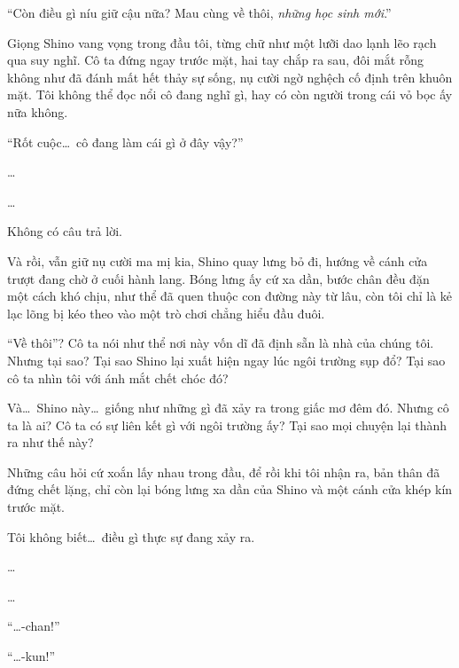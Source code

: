 \documentclass[../main.tex]{subfiles}
\begin{document}


``Còn điều gì níu giữ cậu nữa? Mau cùng về thôi, \emph{những học sinh mới}.''

Giọng Shino vang vọng trong đầu tôi, từng chữ như một lưỡi dao lạnh lẽo rạch qua suy nghĩ. Cô ta đứng ngay trước mặt, hai tay chắp ra sau, đôi mắt rỗng không như đã đánh mất hết thảy sự sống, nụ cười ngờ nghệch cố định trên khuôn mặt. Tôi không thể đọc nổi cô đang nghĩ gì, hay có còn người trong cái vỏ bọc ấy nữa không.


``Rốt cuộc\dots\ cô đang làm cái gì ở đây vậy?''

\dots

\dots

Không có câu trả lời.

Và rồi, vẫn giữ nụ cười ma mị kia, Shino quay lưng bỏ đi, hướng về cánh cửa trượt đang chờ ở cuối hành lang. Bóng lưng ấy cứ xa dần, bước chân đều đặn một cách khó chịu, như thể đã quen thuộc con đường này từ lâu, còn tôi chỉ là kẻ lạc lõng bị kéo theo vào một trò chơi chẳng hiểu đầu đuôi.

``Về thôi''? Cô ta nói như thể nơi này vốn dĩ đã định sẵn là nhà của chúng tôi. Nhưng tại sao? Tại sao Shino lại xuất hiện ngay lúc ngôi trường sụp đổ? Tại sao cô ta nhìn tôi với ánh mắt chết chóc đó?

Và\dots\ Shino này\dots\ giống như những gì đã xảy ra trong giấc mơ đêm đó. Nhưng cô ta là ai? Cô ta có sự liên kết gì với ngôi trường ấy? Tại sao mọi chuyện lại thành ra như thế này?

Những câu hỏi cứ xoắn lấy nhau trong đầu, để rồi khi tôi nhận ra, bản thân đã đứng chết lặng, chỉ còn lại bóng lưng xa dần của Shino và một cánh cửa khép kín trước mặt.

Tôi không biết\dots\ điều gì thực sự đang xảy ra.

\dots

\dots

``\dots-chan!''

``\dots-kun!''
\end{document}

